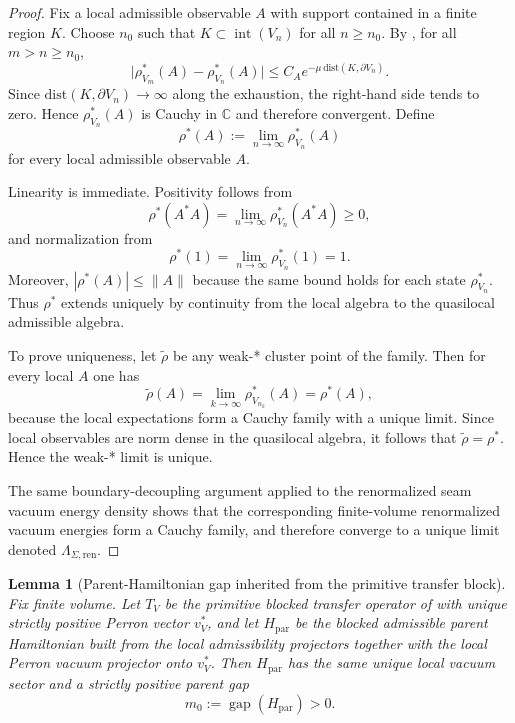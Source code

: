 \documentclass[11pt,a4paper]{article}
\newtheorem{lemma}[theorem]{Lemma}
\theoremstyle{definition}
\theoremstyle{remark}
\newcommand{\Seam}{\Sigma}
\begin{document}
\begin{proof}
Fix a local admissible observable $A$ with support contained in a finite region $K$. Choose $n_0$
such that $K\subset \operatorname{int}(V_n)$ for all $n\ge n_0$. By
, for all $m>n\ge n_0$,
\[
\bigl|\rho^*_{V_m}(A)-\rho^*_{V_n}(A)\bigr|
\le
C_A e^{-\mu\,\mathrm{dist}(K,\partial V_n)}.
\]
Since $\mathrm{dist}(K,\partial V_n)\to\infty$ along the exhaustion, the right-hand side tends to
zero. Hence $\rho^*_{V_n}(A)$ is Cauchy in $\mathbb C$ and therefore convergent. Define
\[
\rho^*(A):=\lim_{n\to\infty}\rho^*_{V_n}(A)
\]
for every local admissible observable $A$.

Linearity is immediate. Positivity follows from
\[
\rho^*(A^*A)=\lim_{n\to\infty}\rho^*_{V_n}(A^*A)\ge 0,
\]
and normalization from
\[
\rho^*(1)=\lim_{n\to\infty}\rho^*_{V_n}(1)=1.
\]
Moreover, $|\rho^*(A)|\le \|A\|$ because the same bound holds for each state $\rho^*_{V_n}$. Thus
$\rho^*$ extends uniquely by continuity from the local algebra to the quasilocal admissible
algebra.

To prove uniqueness, let $\widetilde\rho$ be any weak-* cluster point of the family. Then for every
local $A$ one has
\[
\widetilde\rho(A)=\lim_{k\to\infty}\rho^*_{V_{n_k}}(A)=\rho^*(A),
\]
because the local expectations form a Cauchy family with a unique limit. Since local observables are
norm dense in the quasilocal algebra, it follows that $\widetilde\rho=\rho^*$. Hence the weak-*
limit is unique.

The same boundary-decoupling argument applied to the renormalized seam vacuum energy density shows
that the corresponding finite-volume renormalized vacuum energies form a Cauchy family, and
therefore converge to a unique limit denoted $\Lambda_{\Seam,\mathrm{ren}}$.
\end{proof}

\begin{lemma}[Parent-Hamiltonian gap inherited from the primitive transfer block]
\label{lem:parent-gap-from-transfer-block}
Fix finite volume. Let $T_V$ be the primitive blocked transfer operator of
 with unique strictly positive Perron vector $v_V^\ast$, and
let $H_{\mathrm{par}}$ be the blocked admissible parent Hamiltonian built from the local
admissibility projectors together with the local Perron vacuum projector onto $v_V^\ast$. Then
$H_{\mathrm{par}}$ has the same unique local vacuum sector and a strictly positive parent gap
\[
m_0:=\operatorname{gap}(H_{\mathrm{par}})>0.
\]
\end{lemma}
\end{document}
